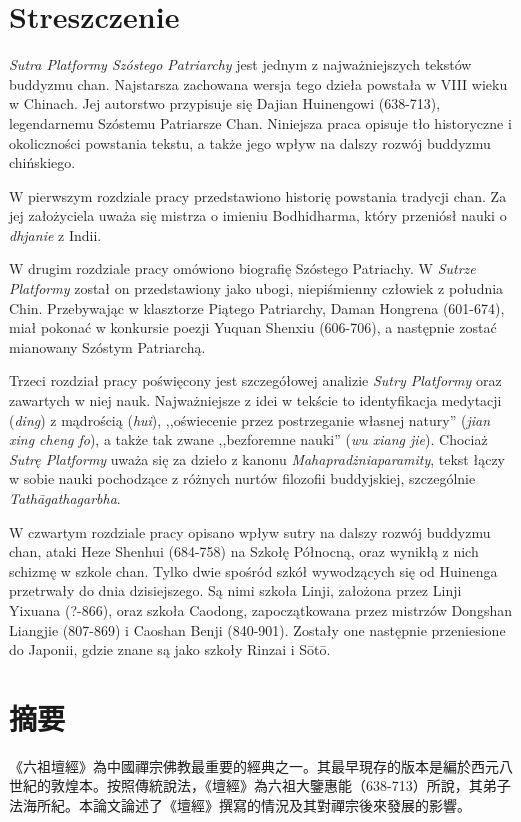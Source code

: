 \makeatletter
\@openrightfalse
\makeatother
\chapter*{Streszczenie}
\textit{Sutra Platformy Szóstego Patriarchy} jest jednym z najważniejszych tekstów buddyzmu chan.
Najstarsza zachowana wersja tego dzieła powstała w VIII wieku w Chinach.
Jej autorstwo przypisuje się Dajian Huinengowi (638-713), legendarnemu Szóstemu Patriarsze Chan.
Niniejsza praca opisuje tło historyczne i okoliczności powstania tekstu, a także jego wpływ na dalszy rozwój buddyzmu chińskiego.

W pierwszym rozdziale pracy przedstawiono historię powstania tradycji chan. Za jej założyciela uważa się mistrza o imieniu Bodhidharma, który przeniósł nauki o \textit{dhjanie} z Indii.

W drugim rozdziale pracy omówiono biografię Szóstego Patriachy.
W \textit{Sutrze Platformy} został on przedstawiony jako ubogi, niepiśmienny człowiek z południa Chin.
Przebywając w klasztorze Piątego Patriarchy, Daman Hongrena (601-674), miał pokonać w konkursie poezji Yuquan Shenxiu (606-706), a następnie zostać mianowany Szóstym Patriarchą.

Trzeci rozdział pracy poświęcony jest szczegółowej analizie \textit{Sutry Platformy} oraz zawartych w niej nauk.
Najważniejsze z idei w tekście to identyfikacja medytacji (\textit{ding}) z mądrością (\textit{hui}), ,,oświecenie przez postrzeganie własnej natury'' (\textit{jian xing cheng fo}), a także tak zwane ,,bezforemne nauki'' (\textit{wu xiang jie}).
Chociaż \textit{Sutrę Platformy} uważa się za dzieło z kanonu \textit{Mahapradżniaparamity}, tekst łączy w sobie nauki pochodzące z różnych nurtów filozofii buddyjskiej, szczególnie \textit{Tathāgathagarbha}.

W czwartym rozdziale pracy opisano wpływ sutry na dalszy rozwój buddyzmu chan, ataki Heze Shenhui (684-758) na Szkołę Północną, oraz wynikłą z nich schizmę w szkole chan.
Tylko dwie spośród szkół wywodzących się od Huinenga przetrwały do dnia dzisiejszego. Są nimi szkoła Linji, założona przez Linji Yixuana (?-866), oraz szkoła Caodong, zapoczątkowana przez mistrzów Dongshan Liangjie (807-869) i Caoshan Benji (840-901).
Zostały one następnie przeniesione do Japonii, gdzie znane są jako szkoły Rinzai i Sōtō.

\chapter*{摘要}
《六祖壇經》為中國禪宗佛教最重要的經典之一。其最早現存的版本是編於西元八世紀的敦煌本。按照傳統說法，《壇經》為六祖大鑒惠能（638-713）所說，其弟子法海所紀。本論文論述了《壇經》撰寫的情況及其對禪宗後來發展的影響。

